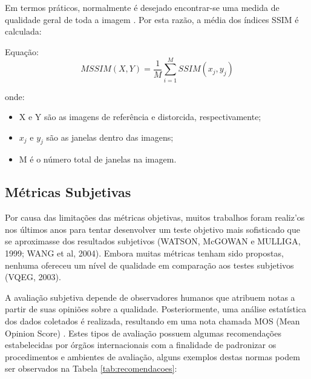 Em termos práticos, normalmente é desejado encontrar-se uma medida de qualidade geral de toda a imagem \cite{wangbovik2004}. Por esta razão, a média dos índices SSIM é calculada:

Equação: \[MSSIM(X, Y) = \frac{1}{M} \sum_{i=1}^{M} SSIM(x_{j}, y_{j})\]

onde:
\begin{itemize}
	\item X e Y são as imagens de referência e distorcida, respectivamente;
	\item \(x_{j}\) e \(y_{j}\) são as janelas dentro das imagens;
	\item M é o número total de janelas na imagem.
\end{itemize}

\subsection{Métricas Subjetivas}

Por causa das limitações das métricas objetivas, muitos trabalhos foram realiz'os nos últimos anos para tentar desenvolver um teste objetivo mais sofisticado que se aproximasse dos resultados subjetivos (WATSON, McGOWAN e MULLIGA, 1999; WANG et al, 2004). Embora muitas métricas tenham sido propostas, nenhuma ofereceu um nível de qualidade em comparação aos testes subjetivos (VQEG, 2003).

A avaliação subjetiva depende de observadores humanos que atribuem notas a partir de suas opiniões sobre a qualidade. Posteriormente, uma análise estatística dos dados coletados é realizada, resultando em uma nota chamada MOS (Mean Opinion Score) \cite{itup930} \cite{albini}. Estes tipos de avaliação possuem algumas recomendações estabelecidas por órgãos internacionais com a finalidade de padronizar os procedimentos e ambientes de avaliação, alguns exemplos destas normas podem ser observados na Tabela \ref{tab:recomendacoes}:


